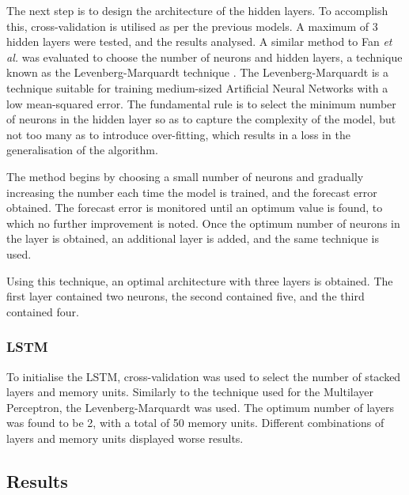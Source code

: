 The next step is to design the architecture of the hidden layers. To accomplish this, cross-validation is utilised as per the previous models. A maximum of 3 hidden layers were tested, and the results analysed. A similar method to Fan \textit{et al.}  \cite{Fan2009} was evaluated to choose the number of neurons and hidden layers, a technique known as the Levenberg-Marquardt technique \cite{more1978levenberg}. The Levenberg-Marquardt is a technique suitable for training medium-sized Artificial Neural Networks with a low mean-squared error. The fundamental rule is to select the minimum number of neurons in the hidden layer so as to capture the complexity of the model, but not too many as to introduce over-fitting, which results in a loss in the generalisation of the algorithm.

The method begins by choosing a small number of neurons and gradually increasing the number each time the model is trained, and the forecast error obtained. The forecast error is monitored until an optimum value is found, to which no further improvement is noted. Once the optimum number of neurons in the layer is obtained, an additional layer is added, and the same technique is used.

Using this technique, an optimal architecture with three layers is obtained. The first layer contained two neurons, the second contained five, and the third contained four.



\subsubsection{LSTM}

To initialise the LSTM, cross-validation was used to select the number of stacked layers and memory units. Similarly to the technique used for the Multilayer Perceptron, the Levenberg-Marquardt was used. The optimum number of layers was found to be 2, with a total of 50 memory units. Different combinations of layers and memory units displayed worse results.



\subsection{Results}



